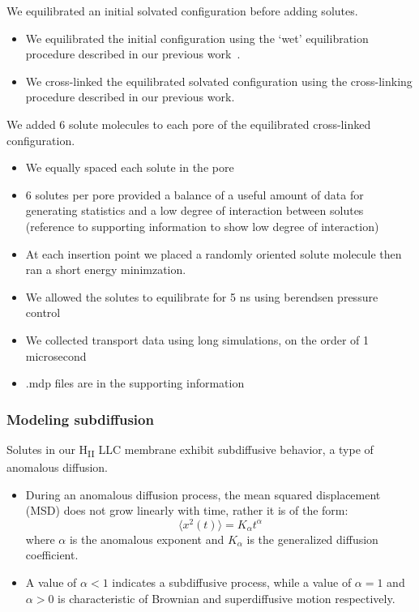 \documentclass{article}
\begin{document}

  We equilibrated an initial solvated configuration before adding solutes.
  \begin{itemize}
	\item We equilibrated the initial configuration using the `wet'
	equilibration procedure described in our previous work~\cite{coscia_understanding_2019}.
	\item We cross-linked the equilibrated solvated configuration using the
	cross-linking procedure described in our previous work. 
  \end{itemize}

  We added 6 solute molecules to each pore of the equilibrated cross-linked
  configuration.
  \begin{itemize}
	\item We equally spaced each solute in the pore
	\item 6 solutes per pore provided a balance of a useful amount of data
	for generating statistics and a low degree of interaction between solutes (reference
	to supporting information to show low degree of interaction)
	\item At each insertion point we placed a randomly oriented solute molecule
	then ran a short energy minimzation.
	\item We allowed the solutes to equilibrate for 5 ns using berendsen 
	pressure control
	\item We collected transport data using long simulations, on the order of
	1 microsecond
	\item .mdp files are in the supporting information %
  \end{itemize}
  
  \subsubsection*{Modeling subdiffusion}\label{method:CTRW}

  Solutes in our H\textsubscript{II} LLC membrane exhibit subdiffusive
  behavior, a type of anomalous diffusion. 
  \begin{itemize}
  	\item During an anomalous diffusion process, the mean squared displacement (MSD)
  	does not grow linearly with time, rather it is of the form:
	\begin{equation} 
	\langle x^2(t) \rangle = K_{\alpha}t^\alpha
	\label{eqn:msd_form}
	\end{equation} 
	where $\alpha$ is the anomalous exponent and $K_\alpha$ is the
	generalized diffusion coefficient.
	\item A value of $\alpha < 1$ indicates a subdiffusive process, while a value of
	$\alpha = 1$ and $\alpha > 0$ is characteristic of Brownian and superdiffusive
	motion respectively.
  \end{itemize}
\end{document}
